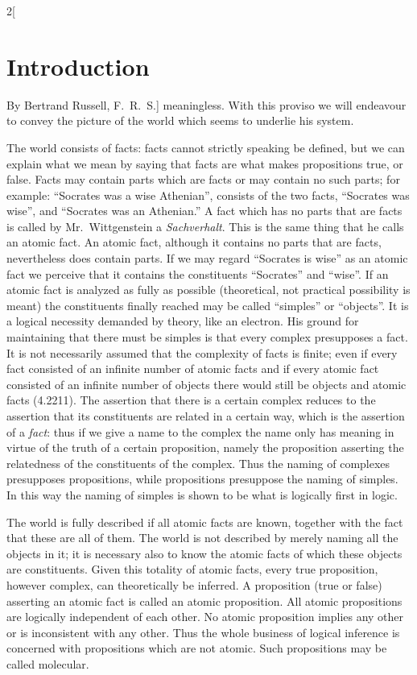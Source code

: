 \documentclass[oneside,openany,12pt]{book}
\begin{document}
\begin{multicols}{2}[\section*{Introduction}By Bertrand Russell, F.\ R.\ S.]
meaningless. With this proviso we will endeavour to convey the picture of the world which seems to underlie his system.

The world consists of facts: facts cannot strictly speaking be defined, but we can explain what we mean by saying that facts are what makes propositions true, or false. Facts may contain parts which are facts or may contain no such parts; for example: ``Socrates was a wise Athenian'', consists of the two facts, ``Socrates was wise'', and ``Socrates was an Athenian.'' A fact which has no parts that are facts is called by Mr.\ Wittgenstein a \emph{Sachverhalt}. This is the same thing that he calls an atomic fact. An atomic fact, although it contains no parts that are facts, nevertheless does contain parts. If we may regard ``Socrates is wise'' as an atomic fact we perceive that it contains the constituents ``Socrates'' and ``wise''. If an atomic fact is analyzed as fully as possible (theoretical, not practical possibility is meant) the constituents finally reached may be called ``simples'' or ``objects''. It is a logical necessity demanded by theory, like an electron. His ground for maintaining that there must be simples is that every complex presupposes a fact. It is not necessarily assumed that the complexity of facts is finite; even if every fact consisted of an infinite number of atomic facts and if every atomic fact consisted of an infinite number of objects there would still be objects and atomic facts (4.2211). The assertion that there is a certain complex reduces to the assertion that its constituents are related in a certain way, which is the assertion of a \emph{fact}: thus if we give a name to the complex the name only has meaning in virtue of the truth of a certain proposition, namely the proposition asserting the relatedness of the constituents of the complex. Thus the naming of complexes presupposes propositions, while propositions presuppose the naming of simples. In this way the naming of simples is shown to be what is logically first in logic.

The world is fully described if all atomic facts are known, together with the fact that these are all of them. The world is not described by merely naming all the objects in it; it is necessary also to know the atomic facts of which these objects are constituents. Given this totality of atomic facts, every true proposition, however complex, can theoretically be inferred. A proposition (true or false) asserting an atomic fact is called an atomic proposition. All atomic propositions are logically independent of each other. No atomic proposition implies any other or is inconsistent with any other. Thus the whole business of logical inference is concerned with propositions which are not atomic. Such propositions may be called molecular.


\end{multicols}
\end{document}
